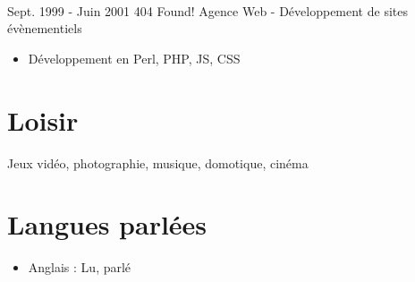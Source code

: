 \documentclass[letterpaper]{twentysecondcv} %
\begin{document}
\begin{twenty}
       
    \\   
    \twentyitem
   		{Sept. 1999 - }
		{Juin 2001}
        {404 Found!}
        {}
        {Agence Web - Développement de sites évènementiels}
        {
        {\begin{itemize}
        \item Développement en Perl, PHP, JS, CSS
        \end{itemize}}
        }
        
\end{twenty}



\section{Loisir}
Jeux vidéo, photographie, musique, domotique, cinéma

\section{Langues parlées}
\begin{itemize}
\item Anglais : Lu, parlé
\end{itemize}
\end{document}
